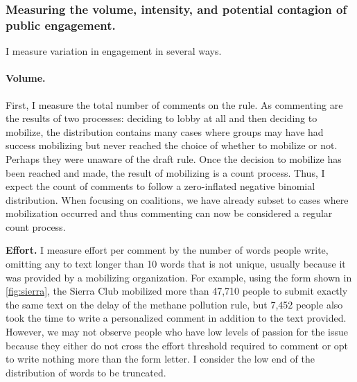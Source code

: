 
% 





\subsubsection{Measuring the volume, intensity, and potential contagion of public engagement.}

I measure variation in engagement in several ways. 

\paragraph{Volume.} 
First, I measure the total number of comments on the rule. As commenting are the results of two processes: deciding to lobby at all and then deciding to mobilize, the distribution contains many cases where groups may have had success mobilizing but never reached the choice of whether to mobilize or not. Perhaps they were unaware of the draft rule. Once the decision to mobilize has been reached and made, the result of mobilizing is a count process. Thus, I expect the count of comments to follow a zero-inflated negative binomial distribution. When focusing on coalitions, we have already subset to cases where mobilization occurred and thus commenting can now be considered a regular count process. 

\textbf{Effort.} I measure effort per comment by the number of words people write, omitting any to text longer than 10 words that is not unique, usually because it was provided by a mobilizing organization. %
For example, using the form shown in \ref{fig:sierra}, the Sierra Club mobilized more than 47,710 people to submit exactly the same text on the delay of the methane pollution rule, but 7,452 people also took the time to write a personalized comment in addition to the text provided. However, we may not observe people who have low levels of passion for the issue because they either do not cross the effort threshold required to comment or opt to write nothing more than the form letter. I consider the low end of the distribution of words to be truncated.

